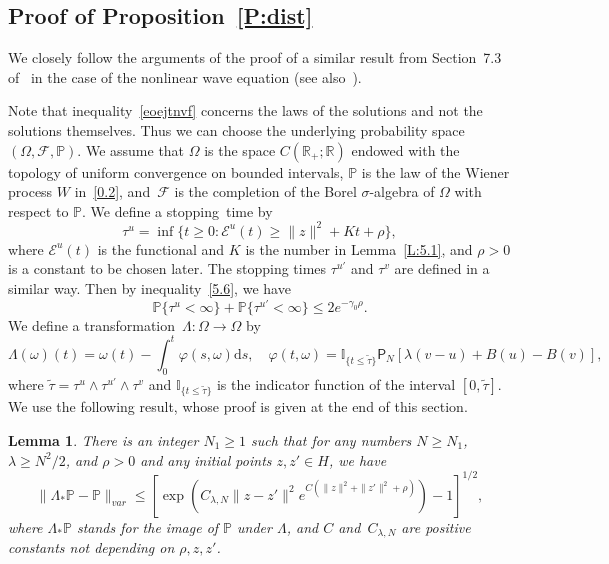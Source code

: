 \documentclass[10pt]{amsart}
\newtheorem{lemm}[theo]{Lemma}\newtheorem{prop}[theo]{Proposition}\newtheorem{coro}[theo]{Corollary}\newtheorem{conj}[theo]{Conjecture}
\theoremstyle{definition}\newtheorem{defi}[theo]{Definition}\newtheorem{rema}[theo]{Remark}\newtheorem{exam}[theo]{Example}\newtheorem{exem}[theo]{Example}\newtheorem{nota}[theo]{Notation}
\newcommand{\ph}{\varphi}
\newcommand{\R}{{\mathbb R}}
\newcommand{\pP}{{\mathbb P}}
\newcommand{\I}{{\mathbb I}}
\newcommand{\EE}{{\mathcal E}}
\newcommand{\FF}{{\mathcal F}}
\newcommand{\la}{\lambda}
\newcommand{\ty}{\infty}
\newcommand{\om}{\omega}
\newcommand{\dd}{\mathrm{d}}
\begin{document}
\subsection{Proof of Proposition~\ref{P:dist}}\label{apascss}



We closely follow the arguments of the proof of a similar result from Section~7.3 of~\cite{MN-2015} in the case of the nonlinear wave equation (see also~\cite[Section~3.3.3]{KS-book}).



Note that inequality~\eqref{eoejtnvf} concerns the laws of the solutions and not the solutions themselves. Thus we can choose the underlying probability space~$(\Omega,\FF,\pP)$. We assume that $\Omega$ is the space $C(\R_+; \R)$ endowed with the topology of uniform convergence on bounded intervals, $\pP$ is the law of the Wiener process $W$ in~\eqref{0.2}, and~$\FF$ is the completion of the Borel $\sigma$-algebra of $\Omega$ with respect to $\pP$. We define a stopping~time by
\[
\tau^u=\inf\{t\geq 0:\EE^u(t)\geq \|z\|^2+Kt+\rho\},
\]
where $\EE^u(t)$ is the functional and $K$ is the number in Lemma~\ref{L:5.1}, and $\rho>0$ is a constant to be chosen later. The stopping times $\tau^{u'}$ and $\tau^v$ are defined in a similar way. Then by inequality~\eqref{5.6}, we have
\begin{equation}\label{estd}
\pP\{\tau^{u}<\ty\}+\pP\{\tau^{u'}<\ty\} \le 2e^{-\gamma_0\rho}.
\end{equation}
We define a transformation~$\Lambda:\Omega\to\Omega$ by
\[
\Lambda(\om)(t)=\om(t)-\int_0^t \ph(s,\omega)\dd s,\quad \ph(t,\omega)=\I_{\{t\le\tilde\tau\}}{\mathsf P}_N[\la(v-u)+B(u)-B(v)],
\]
where $
\tilde\tau=\tau^{u}\wedge\tau^{u'}\wedge\tau^{v} $ and $\I_{\{t\leq\tilde\tau\}}$ is the indicator function of the interval $[0,\tilde\tau]$. We use the following result, whose proof is given at the end of this section.

\begin{lemm}\label{4.21}
There is an integer $N_1\ge1$ such that for any numbers $N\ge N_1$, $\la\ge N^2/2 $, and $\rho>0$ and any initial points $z,z'\in H$, we have
\begin{equation}\label{6.46}
\|\Lambda_*\pP-\pP\|_{ var}\leq \left[\exp\left(C_{\lambda,N}\|z-z'\|^2 e^{ C (\|z\|^2 +\|z'\|^2+\rho)} \right)-1\right]^{1/2},
\end{equation}
where $\Lambda_*\pP$ stands for the image of $\pP$ under $\Lambda$, and $C$ and~$C_{\la,N}$ are positive constants not depending on $\rho, z,z'$.
\end{lemm}
\end{document}

